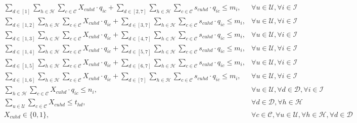 \documentclass[11pt]{article}
\begin{document}
\begin{align}
&\sum\limits_{d\in[1]}\sum\limits_{h\in\mathcal{H}}\sum\limits_{c\in\mathcal{C}}X_{{c}{u}{h}{d}} \cdot q_{{i}{c}} + \sum\limits_{d\in[2,7]}\sum\limits_{h\in\mathcal{H}}\sum\limits_{c\in\mathcal{C}}s_{{c}{u}{h}{d}} \cdot q_{{i}{c}} \leq m_{i}, &\forall u \in \mathcal{U}, \forall i \in \mathcal{I} \label{mathmodel_weeklyquotalimit_rh1}&\\
&\sum\limits_{d\in[1,2]}\sum\limits_{h\in\mathcal{H}}\sum\limits_{c\in\mathcal{C}}X_{{c}{u}{h}{d}} \cdot q_{{i}{c}} + \sum\limits_{d\in[3,7]}\sum\limits_{h\in\mathcal{H}}\sum\limits_{c\in\mathcal{C}}s_{{c}{u}{h}{d}} \cdot q_{{i}{c}} \leq m_{i}, &\forall u \in \mathcal{U}, \forall i \in \mathcal{I} \label{mathmodel_weeklyquotalimit_rh2}&\\
&\sum\limits_{d\in[1,3]}\sum\limits_{h\in\mathcal{H}}\sum\limits_{c\in\mathcal{C}}X_{{c}{u}{h}{d}} \cdot q_{{i}{c}} + \sum\limits_{d\in[4,7]}\sum\limits_{h\in\mathcal{H}}\sum\limits_{c\in\mathcal{C}}s_{{c}{u}{h}{d}} \cdot q_{{i}{c}} \leq m_{i}, &\forall u \in \mathcal{U}, \forall i \in \mathcal{I} \label{mathmodel_weeklyquotalimit_rh3}&\\
&\sum\limits_{d\in[1,4]}\sum\limits_{h\in\mathcal{H}}\sum\limits_{c\in\mathcal{C}}X_{{c}{u}{h}{d}} \cdot q_{{i}{c}} + \sum\limits_{d\in[5,7]}\sum\limits_{h\in\mathcal{H}}\sum\limits_{c\in\mathcal{C}}s_{{c}{u}{h}{d}} \cdot q_{{i}{c}} \leq m_{i}, &\forall u \in \mathcal{U}, \forall i \in \mathcal{I} \label{mathmodel_weeklyquotalimit_rh4}&\\
&\sum\limits_{d\in[1,5]}\sum\limits_{h\in\mathcal{H}}\sum\limits_{c\in\mathcal{C}}X_{{c}{u}{h}{d}} \cdot q_{{i}{c}} + \sum\limits_{d\in[6,7]}\sum\limits_{h\in\mathcal{H}}\sum\limits_{c\in\mathcal{C}}s_{{c}{u}{h}{d}} \cdot q_{{i}{c}} \leq m_{i}, &\forall u \in \mathcal{U}, \forall i \in \mathcal{I} \label{mathmodel_weeklyquotalimit_rh5}&\\
&\sum\limits_{d\in[1,6]}\sum\limits_{h\in\mathcal{H}}\sum\limits_{c\in\mathcal{C}}X_{{c}{u}{h}{d}} \cdot q_{{i}{c}} + \sum\limits_{d\in[7]}\sum\limits_{h\in\mathcal{H}}\sum\limits_{c\in\mathcal{C}}s_{{c}{u}{h}{d}} \cdot q_{{i}{c}} \leq m_{i}, &\forall u \in \mathcal{U}, \forall i \in \mathcal{I} \label{mathmodel_weeklyquotalimit_rh6}&\\
&\sum\limits_{h\in\mathcal{H}}\sum\limits_{c\in\mathcal{C}}X_{{c}{u}{h}{d}} \cdot q_{{i}{c}} \leq n_{i}, &\forall u \in \mathcal{U}, \forall d \in \mathcal{D}, \forall i \in \mathcal{I} \label{mathmodel_dailyquotalimit}&\\
&\sum\limits_{u\in\mathcal{U}}\sum\limits_{c\in\mathcal{C}}X_{{c}{u}{h}{d}} \leq t_{{h}{d}}, &\forall d \in \mathcal{D}, \forall h \in \mathcal{H} \label{mathmodel_channellimit}&\\
&X_{{c}{u}{h}{d}} \in \{0,1\},&\forall c \in \mathcal{C}, \forall u \in \mathcal{U}, \forall h \in \mathcal{H}, \forall d \in \mathcal{D} \label{mathmodel_integrity}
\end{align}\\
\end{document}
